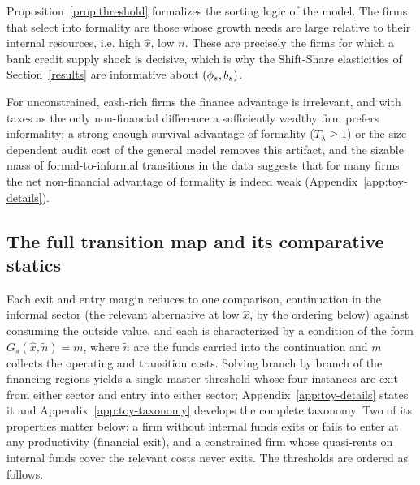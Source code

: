 \documentclass[12pt]{article}
\begin{document}
Proposition~\ref{prop:threshold} formalizes the sorting logic of the model. The firms that select into formality are those whose growth needs are large relative to their internal resources, i.e. high $\hat x$, low $n$. These are precisely the firms for which a bank credit supply shock is decisive, which is why the Shift-Share elasticities of Section~\ref{results} are informative about $(\phi_{s},b_{s})$.

For unconstrained, cash-rich firms the finance advantage is irrelevant, and with taxes as the only non-financial difference a sufficiently wealthy firm prefers informality; a strong enough survival advantage of formality ($T_\lambda \ge 1$) or the size-dependent audit cost of the general model removes this artifact, and the sizable mass of formal-to-informal transitions in the data suggests that for many firms the net non-financial advantage of formality is indeed weak (Appendix~\ref{app:toy-details}).
 
\subsection{The full transition map and its comparative statics}
\label{sec:toy-map}

Each exit and entry margin reduces to one comparison, continuation in the informal sector (the relevant alternative at low $\hat{x}$, by the ordering below) against consuming the outside value, and each is characterized by a condition of the form $G_s(\hat{x}, \tilde{n}) = m$, where $\tilde{n}$ are the funds carried into the continuation and $m$ collects the operating and transition costs. Solving branch by branch of the financing regions yields a single master threshold whose four instances are exit from either sector and entry into either sector; Appendix~\ref{app:toy-details} states it and Appendix~\ref{app:toy-taxonomy} develops the complete taxonomy. Two of its properties matter below: a firm without internal funds exits or fails to enter at any productivity (financial exit), and a constrained firm whose quasi-rents on internal funds cover the relevant costs never exits. The thresholds are ordered as follows.
 
\end{document}
